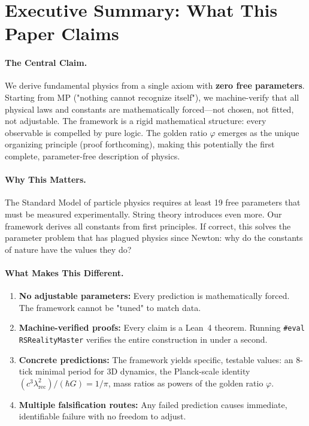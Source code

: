 \documentclass[11pt,a4paper,twoside]{article}
\numberwithin{equation}{section}
\theoremstyle{customthm}
\theoremstyle{customdef}
\theoremstyle{customrem}
\begin{document}
\section*{Executive Summary: What This Paper Claims}\label{sec:executive}

\paragraph{The Central Claim.} We derive fundamental physics from a single axiom with \textbf{zero free parameters}. Starting from MP ("nothing cannot recognize itself"), we machine-verify that all physical laws and constants are mathematically forced—not chosen, not fitted, not adjustable. The framework is a rigid mathematical structure: every observable is compelled by pure logic. The golden ratio $\varphi$ emerges as the unique organizing principle (proof forthcoming), making this potentially the first complete, parameter-free description of physics.

\paragraph{Why This Matters.} The Standard Model of particle physics requires at least 19 free parameters that must be measured experimentally. String theory introduces even more. Our framework derives all constants from first principles. If correct, this solves the parameter problem that has plagued physics since Newton: why do the constants of nature have the values they do?

\paragraph{What Makes This Different.}
\begin{enumerate}[leftmargin=*,topsep=0pt,itemsep=2pt]
\item \textbf{No adjustable parameters:} Every prediction is mathematically forced. The framework cannot be "tuned" to match data.
\item \textbf{Machine-verified proofs:} Every claim is a Lean~4 theorem. Running \texttt{\#eval RSRealityMaster} verifies the entire construction in under a second.
\item \textbf{Concrete predictions:} The framework yields specific, testable values: an 8-tick minimal period for 3D dynamics, the Planck-scale identity $(c^3\lambda_{\mathrm{rec}}^2)/(\hbar G) = 1/\pi$, mass ratios as powers of the golden ratio $\varphi$.
\item \textbf{Multiple falsification routes:} Any failed prediction causes immediate, identifiable failure with no freedom to adjust.
\end{enumerate}
\end{document}
